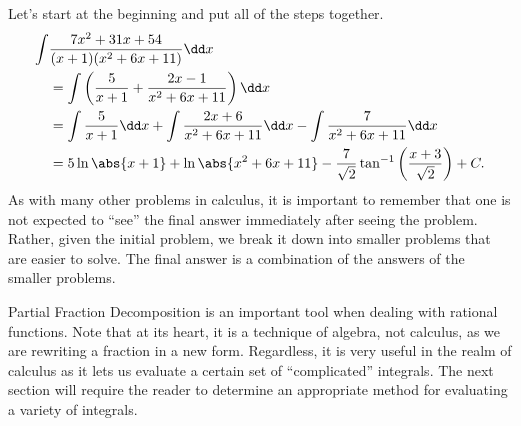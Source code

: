 \begin{example}
Let's start at the beginning and put all of the steps together.
\begin{align*}
	\int&\frac{7x^2+31x+54}{(x+1)(x^2+6x+11)}\dd x \\
	&= \int\left(\frac{5}{x+1} + \frac{2x-1}{x^2+6x+11}\right)\dd x \\
	&= \int\frac{5}{x+1}\dd x  + \int\frac{2x+6}{x^2+6x+11}\dd x -\int\frac{7}{x^2+6x+11}\dd x \\
	&= 5\ln\abs{x+1}+\ln\abs{x^2+6x+11}-\frac7{\sqrt2}\tan^{-1}\left(\frac{x+3}{\sqrt2}\right)+C.
\end{align*}
As with many other problems in calculus, it is important to remember that one is not expected to ``see'' the final answer immediately after seeing the problem. Rather, given the initial problem, we break it down into smaller problems that are easier to solve. The final answer is a combination of the answers of the smaller problems.
\end{example}

Partial Fraction Decomposition is an important tool when dealing with rational functions. Note that at its heart, it is a technique of algebra, not calculus, as we are rewriting a fraction in a new form. Regardless, it is very useful in the realm of calculus as it lets us evaluate a certain set of ``complicated'' integrals.  The next section will require the reader to determine an appropriate method for evaluating a variety of integrals.

